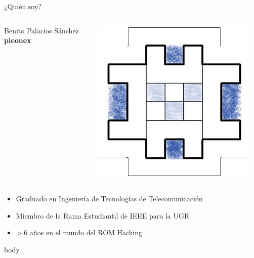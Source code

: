 \begin{frame}{¿Quién soy?}

    \begin{columns}
    \begin{column}{0.7\textwidth}
        \Large
        Benito Palacios Sánchez \\
        \textbf{pleonex}
    \end{column}
    \hfill
    \begin{column}{0.2\textwidth}
        \includegraphics[width=\textwidth]{../pleonex.png}
    \end{column}
    \end{columns}

    \vfill
    \begin{itemize}
        \item Graduado en Ingeniería de Tecnologías de Telecomunicación
        \item Miembro de la Rama Estudiantil de IEEE para la UGR
        \item > 6 años en el mundo del ROM Hacking
    \end{itemize}
\end{frame}

\begin{frame}{}
    body
\end{frame}
